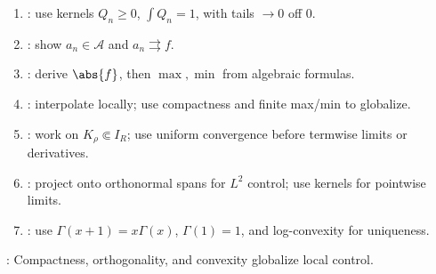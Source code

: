 \begin{method} \label{meth:power-approx-fourier-proof-patterns-source-todo} 
\begin{enumerate}[label=(\roman*)]
\setlength{\itemsep}{0pt}
\item {}: use kernels $Q_n\geq0$, $\int Q_n=1$, with tails $\to0$ off $0$.
\item {}: show $a_n\in\mathcal{A}$ and $a_n\rightrightarrows f$.
\item {}: derive $\abs{f}$, then $\max,\min$ from algebraic formulas.
\item {}: interpolate locally; use compactness and finite max/min to globalize.
\item {}: work on $K_\rho\Subset I_R$; use uniform convergence before termwise limits or derivatives.
\item {}: project onto orthonormal spans for $L^2$ control; use kernels for pointwise limits.
\item {}: use $\Gamma(x+1)=x\Gamma(x)$, $\Gamma(1)=1$, and log-convexity for uniqueness.
\end{enumerate}
: Compactness, orthogonality, and convexity globalize local control.
\end{method}
